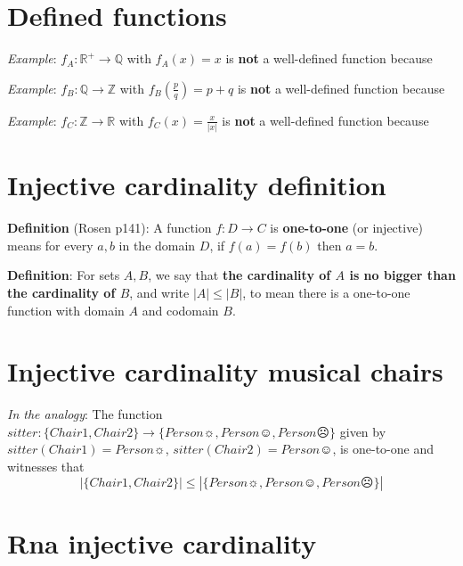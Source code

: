 \documentclass[12pt, oneside]{article}
\begin{document}
\section*{Defined functions}




{\it Example}: $f_A: \mathbb{R}^+ \to \mathbb{Q}$ with $f_A(x) = x$ is {\bf not} a well-defined function because

\vfill


{\it Example}: $f_B: \mathbb{Q} \to \mathbb{Z}$ with $f_B\left(\frac{p}{q}\right) = p+q$ is {\bf not} a well-defined function because

\vfill


{\it Example}: $f_C: \mathbb{Z} \to \mathbb{R}$ with $f_C(x) = \frac{x}{|x|}$ is {\bf not} a well-defined function because \vfill
\section*{Injective cardinality definition}


{\bf Definition}  (Rosen p141): A function $f: D  \to C$ is {\bf one-to-one} (or  injective) means for every $a,b$ in the domain $D$, 
if $f(a) = f(b)$ then  $a=b$.

{\bf Definition}:  For sets $A, B$, we say that  {\bf the  cardinality of $A$ is  no  bigger than the cardinality of  $B$}, and 
write $|A| \leq |B|$, to mean there is a  one-to-one function  with domain $A$  and codomain $B$. \vfill
\section*{Injective cardinality musical chairs}


{\it In the analogy}: The function $sitter: \{ Chair1, Chair2\} \to \{ Person\sun, Person\smiley, Person\frownie \}$ given
by $sitter(Chair1) = Person\sun$,  $sitter(Chair2) = Person\smiley$, is one-to-one and witnesses that 
\[
| \{ Chair1, Chair2\} | \leq |\{ Person\sun, Person\smiley, Person\frownie \}|
\] \vfill
\section*{Rna injective cardinality}
\end{document}
